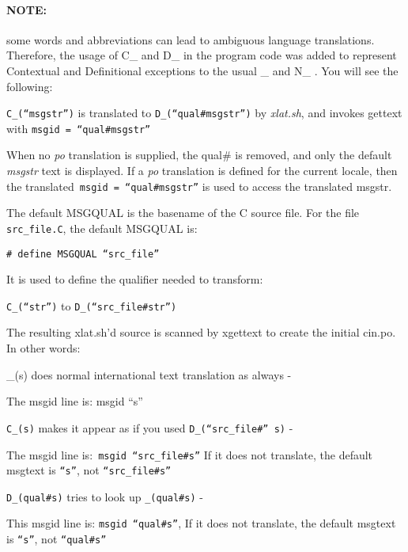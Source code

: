 \paragraph{NOTE:} some words and abbreviations can lead to ambiguous language translations.  Therefore, the usage of C\_ and D\_ in the program code was added to represent Contextual and Definitional exceptions to the usual \_ and N\_ .  You will see the following:

\vspace{2ex} \texttt{C\_(“msgstr”)}  is translated to \texttt{D\_(“qual\#msgstr”)} by \textit{xlat.sh}, and invokes gettext with \texttt{msgid = “qual\#msgstr”}

\vspace{2ex} When no \textit{po} translation is supplied, the qual\# is removed, and only the default \textit{msgstr} text is displayed.   If a \textit{po} translation is defined for the current locale, then the translated\texttt{ msgid = “qual\#msgstr”} is used to access the translated msgstr.

\vspace{2ex} \noindent The default MSGQUAL is the basename of the C source file.  For the file \texttt{src\_file.C}, the default MSGQUAL is:

\vspace{2ex} \texttt{\# define MSGQUAL “src\_file”}

\vspace{2ex} \noindent It is used to define the qualifier needed to transform:

\vspace{2ex} \texttt{C\_(“str”)} to \texttt{D\_(“src\_file\#str”)}

\vspace{2ex} \noindent The resulting xlat.sh'd source is scanned by xgettext to create the initial cin.po.  In other words:

\vspace{2ex} \_(s) does normal international text translation as always -

\vspace{2ex} \noindent The msgid line is: msgid “s”

\vspace{2ex} \texttt{C\_(s)} makes it appear as if you used \texttt{D\_(“src\_file\#” s)} -

\vspace{2ex} \noindent The msgid line is:\texttt{ msgid “src\_file\#s”}
If it does not translate, the default msgtext is \texttt{“s”}, not \texttt{“src\_file\#s”}

\vspace{2ex} \texttt{D\_(qual\#s)} tries to look up \texttt{\_(qual\#s)} -

\vspace{2ex} \noindent This msgid line is: \texttt{msgid “qual\#s”},
If it does not translate, the default msgtext is \texttt{“s”}, not \texttt{“qual\#s”}

